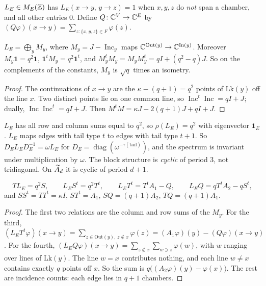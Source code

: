 \begin{definition}\label{V3P4:def:LE}
$L_E\in M_E(\mathbb{Z})$ has $L_E(x\to y,\,y\to z)=1$ when $x,y,z$ do \emph{not} span a chamber, and
all other entries $0$. Define $Q\colon\mathbb{C}^{V}\to\mathbb{C}^{E}$ by $(Q\varphi)(x\to y)=\sum_{z:\{x,y,z\}\in
F}\varphi(z)$.
\end{definition}

\begin{lemma}\label{V3P4:lem:local}
$L_E=\bigoplus_yM_y$, where $M_y=J-\operatorname{Inc}_y$ maps $\mathbb{C}^{\mathrm{Out}(y)}\to
\mathbb{C}^{\mathrm{In}(y)}$. Moreover $M_y\mathbf 1=q^{2}\mathbf 1$, $\mathbf 1^{t}M_y=q^{2}\mathbf
1^{t}$, and $M_y^{t}M_y=M_yM_y^{t}=qI+(q^{2}-q)J$. So on the complements of the constants,
$M_y$ is $\sqrt q$ times an isometry.
\end{lemma}

\begin{proof}
The continuations of $x\to y$ are the $\kappa-(q+1)=q^{2}$ points of $\mathrm{Lk}(y)$ off the
line $x$. Two distinct points lie on one common line, so
$\operatorname{Inc}^{t}\operatorname{Inc}=qI+J$; dually, $\operatorname{Inc}\operatorname{Inc}^{t}=qI+J$.
Then $M^{t}M=\kappa J-2(q+1)J+qI+J$.
\end{proof}

\begin{proposition}\label{V3P4:prop:perron}
$L_E$ has all row and column sums equal to $q^{2}$, so $\rho(L_E)=q^{2}$ with eigenvector
$\mathbf 1_E$. $L_E$ maps edges with tail type $t$ to edges with tail type $t+1$. So
$D_EL_ED_E^{-1}=\omega L_E$ for $D_E=\operatorname{diag}(\omega^{-\tau(\mathrm{tail})})$, and the
spectrum is invariant under multiplication by $\omega$. The block structure is \emph{cyclic}
of period $3$, not tridiagonal. On $\widetilde A_{d}$ it is cyclic of period $d+1$.
\end{proposition}

\begin{proposition}\label{V3P4:prop:relations}
\[
TL_E=q^{2}S,\qquad L_ES^{t}=q^{2}T^{t},\qquad L_ET^{t}=T^{t}A_1-Q,\qquad L_EQ=qT^{t}A_2-qS^{t},
\]
and $SS^{t}=TT^{t}=\kappa I$, $ST^{t}=A_1$, $SQ=(q+1)A_2$, $TQ=(q+1)A_1$.
\end{proposition}

\begin{proof}
The first two relations are the column and row sums of the $M_y$. For the third,
$(L_ET^{t}\varphi)(x\to y)=\sum_{z\in\mathrm{Out}(y),\,z\notin x}\varphi(z)=(A_1\varphi)(y)-(Q\varphi)(x\to y)$.
For the fourth, $(L_EQ\varphi)(x\to y)=\sum_{z\notin x}\sum_{w\ni z}\varphi(w)$, with $w$
ranging over lines of $\mathrm{Lk}(y)$. The line $w=x$ contributes nothing, and each line
$w\ne x$ contains exactly $q$ points off $x$. So the sum is
$q\bigl((A_2\varphi)(y)-\varphi(x)\bigr)$. The rest are incidence counts: each edge lies in
$q+1$ chambers.
\end{proof}

